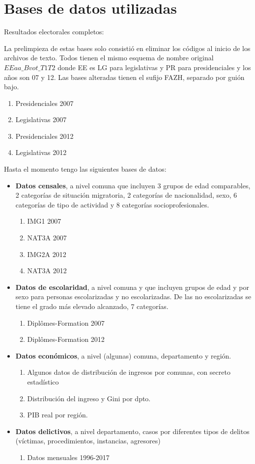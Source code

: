 \chapter{Bases de datos utilizadas}

Resultados electorales completos: 

La prelimpieza de estas bases solo consistió en eliminar los códigos al inicio de los archivos de texto. Todos tienen el mismo esquema de nombre original $EEaa\_Bvot\_T1T2$ donde EE es LG para legislativas y PR para presidenciales y los años son 07 y 12. Las bases alteradas tienen el sufijo FAZH, separado por guión bajo. 
\begin{enumerate}
\item Presidenciales 2007 \parencite{PresFr07}
\item Legislativas 2007 \parencite{LegisFr07}
\item Presidenciales 2012 \parencite{PresFr12}
\item Legislativas 2012 \parencite{LegisFr12}
\end{enumerate}

Hasta el momento tengo las siguientes bases de datos: 

\begin{itemize}
\item \textbf{Datos censales}, a nivel comuna que incluyen 3 grupos de edad comparables, 2 categorías de situación migratoria, 2 categorías de nacionalidad, sexo, 6 categorías de tipo de actividad y 8 categorías socioprofesionales. 
\begin{enumerate}
\item IMG1 2007
\item NAT3A 2007
\item IMG2A 2012
\item NAT3A 2012
\end{enumerate}
\item \textbf{Datos de escolaridad}, a nivel comuna y que incluyen grupos de edad y por sexo para personas escolarizadas y no escolarizadas. De las no escolarizadas se tiene el grado más elevado alcanzado, 7 categorías.
\begin{enumerate}
\item Diplômes-Formation 2007
\item Diplômes-Formation 2012
\end{enumerate}
\item \textbf{Datos económicos}, a nivel (algunas) comuna, departamento y región.
\begin{enumerate}
\item Algunos datos de distribución de ingresos por comunas, con secreto estadístico
\item Distribución del ingreso y Gini por dpto.
\item PIB real por región.
\end{enumerate} 
\item \textbf{Datos delictivos}, a nivel departamento, casos por diferentes tipos de delitos (víctimas, procedimientos, instancias, agresores)
\begin{enumerate}
\item Datos mensuales 1996-2017
\end{enumerate}
\end{itemize}

